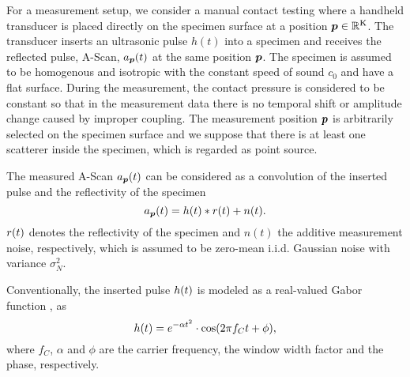 For a measurement setup, we consider a manual contact testing where a handheld transducer is placed directly on the specimen surface at a position $\bm{p} \in {\mathbb{R}}^{\operatorname{K}}$.%
The transducer inserts an ultrasonic pulse $h(t)$ into a specimen and receives the reflected pulse, A-Scan,  $a_{\bm{p}} (t)$ at the same position $\bm{p}$. The specimen is assumed to be homogenous and isotropic with the constant speed of sound $c_0$ and have a flat surface. During the measurement, the contact pressure is considered to be constant so that in the measurement data there is no temporal shift or amplitude change caused by improper coupling. The measurement position $\bm{p}$ is arbitrarily selected on the specimen surface and we suppose that there is at least one scatterer inside the specimen, which is regarded as point source. \par

The measured A-Scan $a_{\bm{p}} (t)$ can be considered as a convolution of the inserted pulse and the reflectivity of the specimen
\begin{equation} \label{eq:ascan_base}
\ascan_{\pp} (t) = \pulse (t) \ast \reflectivity (t) + n(t).
\end{equation}
$r (t)$ denotes the reflectivity of the specimen and $n(t)$ the additive measurement noise, respectively, which is assumed to be zero-mean i.i.d. Gaussian noise with variance $\sigma_{N}^2$. \par

Conventionally, the inserted pulse $h (t)$ is modeled as a real-valued Gabor function \citep{GaborAsymmChirp}, as
\begin{equation} \label{eq:pulse}
\pulse (t) = e^{- \alpha t^2} \cdot \cos (2 \pi f_C t + \phi),
\end{equation}
where $f_C$, $\alpha$  and $\phi$ are the carrier frequency, the window width factor and the phase, respectively.\par

